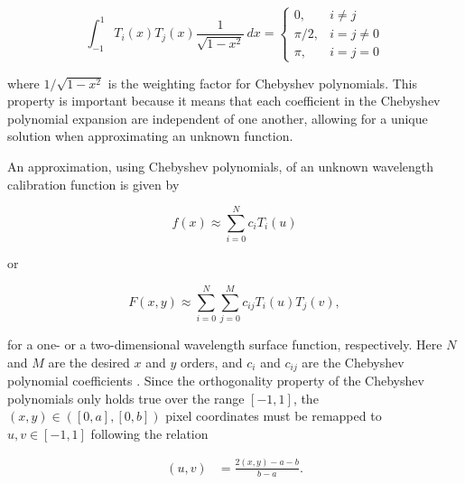 \begin{equation}
  \int_{-1}^{1} T_{i}(x) T_{j}(x) \frac{1}{\sqrt{1-x^{2}}} \,dx =
  \begin{cases}
    0,       & i \neq j     \\
    \pi / 2, & i = j \neq 0 \\
    \pi,     & i = j = 0
  \end{cases}
  \label{eq:chebyorth}
\end{equation}

\noindent where $1 / \sqrt{1 - x^{2}}$ is the weighting factor for Chebyshev polynomials. This property is important because it means that each coefficient in the Chebyshev polynomial expansion are independent of one another, allowing for a unique solution when approximating an unknown function.
\prgph

An approximation, using Chebyshev polynomials, of an unknown wavelength calibration function is given by

\begin{equation}
  f(x) \approx \sum_{i = 0}^{N}  c_{i} T_{i}(u)
  \label{eq:chebyshev}
\end{equation}

\noindent or

\begin{equation}
  F(x, y) \approx \sum_{i = 0}^{N} \sum_{j = 0}^{M} c_{ij} T_{i}(u) T_{j}(v),
  \label{eq:chebyshev2D}
\end{equation}

\noindent for a one- or a two-dimensional wavelength surface function, respectively. Here $N$ and $M$ are the desired $x$ and $y$ orders, and $c_{i}$ and $c_{ij}$ are the Chebyshev polynomial coefficients \citep{chebysurf, cheby2d}. Since the orthogonality property of the Chebyshev polynomials only holds true over the range $[-1, 1]$, the $(x, y) \in ([0, a], [0, b])$ pixel coordinates must be remapped to $u, v \in [-1, 1]$ following the relation

\begin{align}
  (u, v) & = \frac{2 (x, y) - a - b}{b - a}.
  \label{eq:XtoUV}
\end{align}



